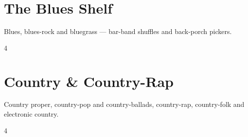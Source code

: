 \documentclass[a4paper,landscape]{memoir}
\begin{document}
\chapter{The Blues Shelf}
Blues, blues-rock and bluegrass — bar-band shuffles and back-porch pickers.
\clearpage\begin{multicols*}{4}
\end{multicols*}

\chapter{Country \& Country-Rap}
Country proper, country-pop and country-ballads, country-rap, country-folk and electronic country.
\clearpage\begin{multicols*}{4}
\end{multicols*}
\end{document}
